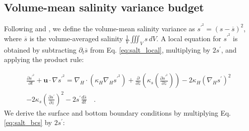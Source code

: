 \subsection{Volume-mean salinity variance budget}

Following \citet{MacCready_2018} and \citet{Lorenz_2021}, we define the volume-mean salinity variance as $s^{\prime^2} = (s-\overline{s})^2$, where $\overline{s}$ is the volume-averaged salinity $\frac{1}{V} \iiint_V s \, dV$. A local equation for $s^{\prime^2}$ is obtained by subtracting $\partial_t \overline{s}$ from Eq. \ref{eq:salt_local}, multiplying by $2s^{\prime}$, and applying the product rule:

\begin{equation} \label{eq:svar_local}
    \begin{split}
    \frac{\partial s^{\prime^2}}{\partial t} + \textbf{u} \cdot \nabla s^{\prime^2} = \nabla_H \cdot \left(\kappa_H \nabla_H s^{\prime^2} \right)+ \frac{\partial}{\partial z} \left(\kappa_s \left(\frac{\partial s^{\prime^2}}{\partial z} \right) \right) -2\kappa_H \left(\nabla_H s^\prime \right)^2\\
     -2\kappa_s \left(\frac{\partial s^\prime}{\partial z} \right)^2 - 2s^{\prime} \frac{d \overline{s}}{dt} \quad .
    \end{split}
\end{equation}
We derive the surface and bottom boundary conditions by multiplying Eq. \ref{eq:salt_bcs} by $2s^{\prime}$:

